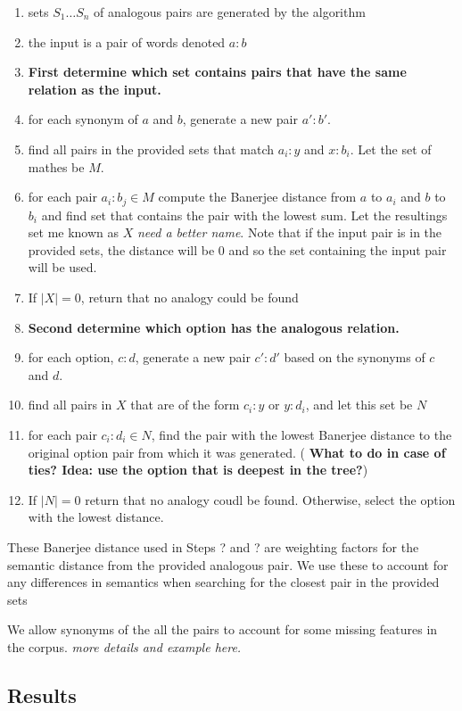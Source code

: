 \documentclass[11pt]{article}
\begin{document}
\begin{enumerate}
  \item sets $S_1 \ldots S_n$ of analogous pairs are generated by the algorithm
  \item the input is a pair of words denoted $a:b$
  \item[] {\bf First determine which set contains pairs that have the same
    relation as the input.}
  \item for each synonym of $a$ and $b$, generate a new pair $a':b'$.
  \item find all pairs in the provided sets that match $a_i:y$ and $x:b_i$.  Let
    the set of mathes be $M$.
  \item for each pair $a_i:b_j \in M$ compute the Banerjee distance from $a$ to
    $a_i$ and $b$ to $b_i$ and find set that contains the pair with the lowest
    sum.  Let the resultings set me known as $X$ \emph{need a better name}.
    Note that if the input pair is in the provided sets, the distance will be 0
    and so the set containing the input pair will be used.
  \item If $|X| = 0$, return that no analogy could be found
  \item[] {\bf Second determine which option has the analogous relation.}
  \item for each option, $c:d$, generate a new pair $c':d'$ based on the
    synonyms of $c$ and $d$.
  \item find all pairs in $X$ that are of the form $c_i:y$ or $y:d_i$, and let
    this set be $N$
  \item for each pair $c_i:d_i \in N$, find the pair with the lowest Banerjee
    distance to the original option pair from which it was generated.  ({\bf
      What to do in case of ties?  Idea: use the option that is deepest in the
      tree?})    
  \item If $|N| = 0$ return that no analogy coudl be found.  Otherwise, select
    the option with the lowest distance.
\end{enumerate}
These Banerjee distance used in Steps ? and ? are weighting factors for the
semantic distance from the provided analogous pair.  We use these to account for
any differences in semantics when searching for the closest pair in the provided
sets

We allow synonyms of the all the pairs to account for some missing features in
the corpus.  \emph{more details and example here.}

\subsection{Results}
\end{document}
